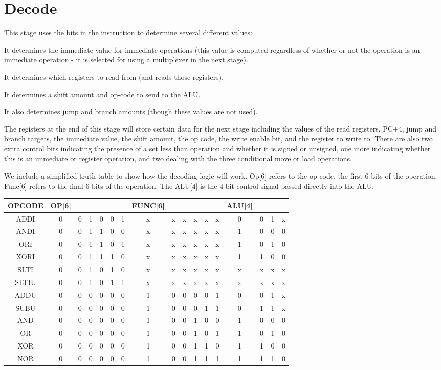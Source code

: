 \documentclass{article}
\begin{document}
\section*{Decode}
This stage uses the bits in the instruction to determine several different values:

It determines the immediate value for immediate operations (this value is computed regardless of whether or not the operation is an immediate operation - it is selected for using a multiplexer in the next stage).

It determines which registers to read from (and reads those registers).

It determines a shift amount and op-code to send to the ALU.

It also determines jump and branch amounts (though these values are not used).

The registers at the end of this stage will store certain data for the next stage including the values of the read registers, PC$+4$, jump and branch targets, the immediate value, the shift amount, the op code, the write enable bit, and the register to write to. There are also two extra control bits indicating the presence of a set less than operation and whether it is signed or unsigned, one more indicating whether this is an immediate or register operation, and two dealing with the three conditional move or load operations. 

We include a simplified truth table to show how the decoding logic will work. Op[6] refers to the op-code, the first 6 bits of the operation. Func[6] refers to the final 6 bits of the operation. The ALU[4] is the 4-bit control signal passed directly into the ALU. 

\begin{tabular}{| c | c  c  c  c  c  c | c c c c c c | c c c c |}
\hline
OPCODE & OP[6] &&&&&& FUNC[6] &&&&&& ALU[4] &&&\\
\hline
ADDI	&0	&0	&1	&0	&0	&1	&x	&x	&x	&x	&x	&x	&0	&0	&1	&x \\
ANDI	&0	&0	&1	&1	&0	&0	&x	&x	&x	&x	&x	&x	&1	&0	&0	&0 \\
ORI		&0	&0	&1	&1	&0	&1	&x	&x	&x	&x	&x	&x	&1	&0	&1	&0 \\
XORI	&0	&0	&1	&1	&1	&0	&x	&x	&x	&x	&x	&x	&1	&1	&0	&0 \\
SLTI		&0	&0	&1	&0	&1	&0	&x	&x	&x	&x	&x	&x	&x	&x	&x	&x \\
SLTIU	&0	&0	&1	&0	&1	&1	&x	&x	&x	&x	&x	&x	&x	&x	&x	&x\\
\hline
ADDU	&0	&0	&0	&0	&0	&0	&1	&0	&0	&0	&0	&1	&0	&0	&1	&x\\
SUBU	&0	&0	&0	&0	&0	&0	&1	&0	&0	&0	&1	&1	&0	&1	&1	&x\\
AND		&0	&0	&0	&0	&0	&0	&1	&0	&0	&1	&0	&0	&1	&0	&0	&0\\
OR		&0	&0	&0	&0	&0	&0	&1	&0	&0	&1	&0	&1	&1	&0	&1	&0\\
XOR		&0	&0	&0	&0	&0	&0	&1	&0	&0	&1	&1	&0	&1	&1	&0	&0\\
NOR		&0	&0	&0	&0	&0	&0	&1	&0	&0	&1	&1	&1	&1	&1	&1	&0\\
\hline
\end{tabular}
\end{document}
